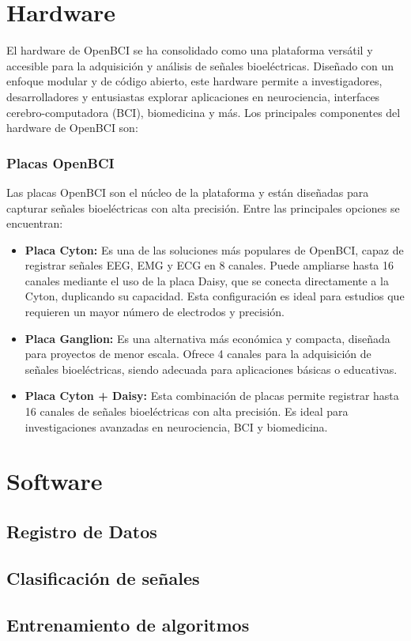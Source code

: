 \section{Hardware}
El hardware de OpenBCI se ha consolidado como una plataforma versátil y accesible para la adquisición y análisis de señales bioeléctricas. Diseñado con un enfoque modular y de código abierto, este hardware permite a investigadores, desarrolladores y entusiastas explorar aplicaciones en neurociencia, interfaces cerebro-computadora (BCI), biomedicina y más. Los principales componentes del hardware de OpenBCI son:
\subsubsection{Placas OpenBCI}
Las placas OpenBCI son el núcleo de la plataforma y están diseñadas para capturar señales bioeléctricas con alta precisión. Entre las principales opciones se encuentran:
\begin{itemize}
    \item \textbf{Placa Cyton:} Es una de las soluciones más populares de OpenBCI, capaz de registrar señales EEG, EMG y ECG en 8 canales. Puede ampliarse hasta 16 canales mediante el uso de la placa Daisy, que se conecta directamente a la Cyton, duplicando su capacidad. Esta configuración es ideal para estudios que requieren un mayor número de electrodos y precisión.
    \item \textbf{Placa Ganglion:} Es una alternativa más económica y compacta, diseñada para proyectos de menor escala. Ofrece 4 canales para la adquisición de señales bioeléctricas, siendo adecuada para aplicaciones básicas o educativas.
    \item \textbf{Placa Cyton + Daisy:} Esta combinación de placas permite registrar hasta 16 canales de señales bioeléctricas con alta precisión. Es ideal para investigaciones avanzadas en neurociencia, BCI y biomedicina.
\end{itemize}


\section{Software}

\subsection{Registro de Datos}

\subsection{Clasificación de señales}

\subsection{Entrenamiento de algoritmos}